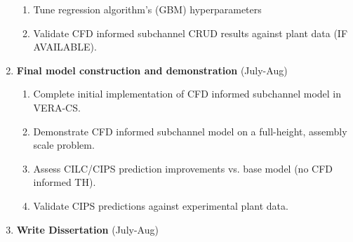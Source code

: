 \begin{enumerate}
\begin{enumerate}
        \item Tune regression algorithm's (GBM) hyperparameters
        \item Validate CFD informed subchannel CRUD results against plant data (IF AVAILABLE).
    \end{enumerate}
\item \textbf{Final model construction and demonstration} (July-Aug)
    \begin{enumerate}
        \item Complete initial implementation of CFD informed subchannel model in VERA-CS.
        \item Demonstrate CFD informed subchannel model on a full-height, assembly scale problem.
        \item Assess CILC/CIPS prediction improvements vs. base model (no CFD informed TH).
        \item Validate CIPS predictions against experimental plant data.
    \end{enumerate}
\item \textbf{Write Dissertation} (July-Aug)
\end{enumerate}

\pagebreak

